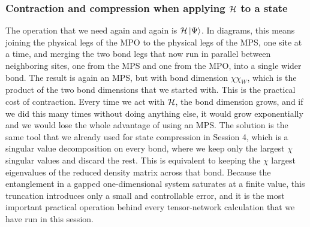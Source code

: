 \documentclass[lecture_notes.tex]{subfiles}
\begin{document}
\subsubsection{Contraction and compression when applying $\mathcal{H}$ to a state}
The operation that we need again and again is $\mathcal{H}\ket{\Psi}$. In diagrams, this means joining the
physical legs of the MPO to the physical legs of the MPS, one site at a time, and merging the two
bond legs that now run in parallel between neighboring sites, one from the MPS and one from the
MPO, into a single wider bond. The result is again an MPS, but with bond dimension $\chi\chi_W$,
which is the product of the two bond dimensions that we started with. This is the practical cost of
contraction. Every time we act with $\mathcal{H}$, the bond dimension grows, and if we did this many times
without doing anything else, it would grow exponentially and we would lose the whole advantage of
using an MPS. The solution is the same tool that we already used for state compression in
Session 4, which is a singular value decomposition on every bond, where we keep only the largest
$\chi$ singular values and discard the rest. This is equivalent to keeping the $\chi$ largest
eigenvalues of the reduced density matrix across that bond. Because the entanglement in a gapped
one-dimensional system saturates at a finite value, this truncation introduces only a small and
controllable error, and it is the most important practical operation behind every tensor-network
calculation that we have run in this session.
\end{document}
